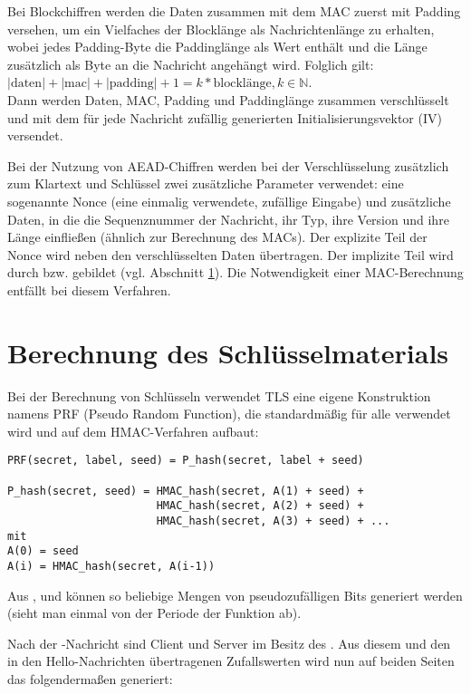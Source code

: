 Bei Blockchiffren werden die Daten zusammen mit dem MAC zuerst mit Padding versehen, um ein Vielfaches der Blocklänge als Nachrichtenlänge zu erhalten, wobei jedes Padding-Byte die Paddinglänge als Wert enthält und die Länge zusätzlich als Byte an die Nachricht angehängt wird. Folglich gilt:
\( |\text{daten}| + |\text{mac}| + |\text{padding}| + 1 = k * \text{blocklänge}, k \in \mathbb{N}\).\\
Dann werden Daten, MAC, Padding und Paddinglänge zusammen verschlüsselt und mit dem für jede Nachricht zufällig generierten Initialisierungsvektor (IV) versendet.

Bei der Nutzung von AEAD-Chiffren werden bei der Verschlüsselung zusätzlich zum Klartext und Schlüssel zwei zusätzliche Parameter verwendet: eine sogenannte Nonce (eine einmalig verwendete, zufällige Eingabe) und zusätzliche Daten, in die die Sequenznummer der Nachricht, ihr Typ, ihre Version und ihre Länge einfließen (ähnlich zur Berechnung des MACs). Der explizite Teil der Nonce wird neben den verschlüsselten Daten übertragen. Der implizite Teil wird durch  bzw.  gebildet (vgl. Abschnitt \ref{sec_key_material}). Die Notwendigkeit einer MAC-Berechnung entfällt bei diesem Verfahren.

\section{Berechnung des Schlüsselmaterials}
\label{sec_key_material}

Bei der Berechnung von Schlüsseln verwendet TLS eine eigene Konstruktion namens PRF (Pseudo Random Function), die standardmäßig für alle \ciphersuites{} verwendet wird und auf dem HMAC-Verfahren aufbaut:

\begin{lstlisting}
PRF(secret, label, seed) = P_hash(secret, label + seed)

P_hash(secret, seed) = HMAC_hash(secret, A(1) + seed) +
					   HMAC_hash(secret, A(2) + seed) +
					   HMAC_hash(secret, A(3) + seed) + ...
mit
A(0) = seed
A(i) = HMAC_hash(secret, A(i-1))
\end{lstlisting}

Aus ,  und  können so beliebige Mengen von pseudozufälligen Bits generiert werden (sieht man einmal von der Periode der Funktion ab).

Nach der \clientkeyexchange{}-Nachricht sind Client und Server im Besitz des \premastersecret{}. Aus diesem und den in den Hello-Nachrichten übertragenen Zufallswerten wird nun auf beiden Seiten das \mastersecret{} folgendermaßen generiert:

